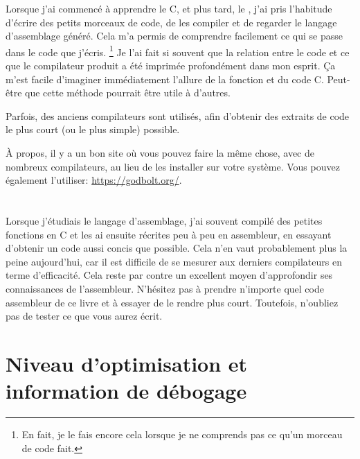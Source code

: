 ﻿

Lorsque j'ai commencé à apprendre le C, et plus tard, le \Cpp, j'ai pris l'habitude d'écrire des petits morceaux de
code, de les compiler et de regarder le langage d'assemblage généré.
Cela m'a permis de comprendre facilement ce qui se passe dans le code que j'écris.
\footnote{En fait, je le fais encore cela lorsque je ne comprends pas ce qu'un morceau de code fait.}
Je l'ai fait si souvent que la relation entre le code \Cpp et ce que le compilateur produit a été imprimée profondément dans mon esprit.
Ça m'est facile d'imaginer immédiatement l'allure de la fonction et du code C.
Peut-être que cette méthode pourrait être utile à d'autres.


Parfois, des anciens compilateurs sont utilisés, afin d'obtenir des extraits de code le plus court (ou le plus simple) possible.

À propos, il y a un bon site où vous pouvez faire la même chose, avec de nombreux
compilateurs, au lieu de les installer sur votre système.
Vous pouvez également l'utiliser: \url{https://godbolt.org/}.

\section*{\Exercises}

Lorsque j'étudiais le langage d'assemblage, j'ai souvent compilé des petites fonctions
en C et les ai ensuite récrites peu à peu en assembleur, en essayant d'obtenir un
code aussi concis que possible.
Cela n'en vaut probablement plus la peine aujourd'hui, car il est difficile de se
mesurer aux derniers compilateurs en terme d'efficacité. Cela reste par contre un
excellent moyen d'approfondir ses connaissances de l'assembleur.
N'hésitez pas à prendre n'importe quel code assembleur de ce livre et à essayer
de le rendre plus court.
Toutefois, n'oubliez pas de tester ce que vous aurez écrit.

\section*{Niveau d'optimisation et information de débogage}

